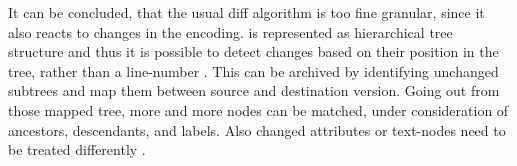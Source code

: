 	It can be concluded, that the usual diff algorithm is too fine granular, since it also reacts to changes in the encoding. \xml is represented as hierarchical tree structure and thus it is possible to detect changes based on their position in the tree, rather than a line-number \citep{Wang2003,Chawathe1996,Cobena2002}.
	This can be archived by identifying unchanged subtrees and map them between source and destination version. Going out from those mapped tree, more and more nodes can be matched, under consideration of ancestors, descendants, and labels. Also changed attributes or text-nodes need to be treated differently \citep{Cobena2002}.
	
	

